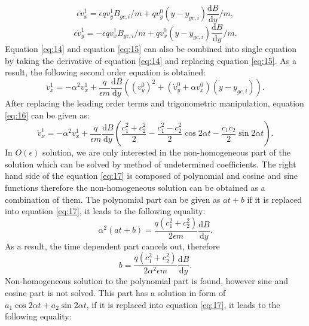 \documentclass[11pt]{amsart}
\begin{document}
\begin{equation}
\label{eq:14}
\epsilon\dot{v}_{x}^{1}=\epsilon q v_{y}^{1} B_{gc,i}/m+q v_{y}^{0}(y-y_{gc,i})\frac{\mathrm{d}B}{\mathrm{d}y}/m,
\end{equation}
\begin{equation}
\label{eq:15}
\epsilon\dot{v}_{y}^{1}=-\epsilon q v_{x}^{1} B_{gc,i}/m+q v_{x}^{0}(y-y_{gc,i})\frac{\mathrm{d}B}{\mathrm{d}y}/m.
\end{equation}
Equation \ref{eq:14} and equation \ref{eq:15} can also be combined into single equation by taking the derivative of equation \ref{eq:14} and replacing equation \ref{eq:15}. As a result, the following second order equation is obtained:
\begin{equation}
\label{eq:16}
\ddot{v}_{x}^{1}=-\alpha^2 v_{x}^{1}+\frac{q}{\epsilon m}\frac{\mathrm{d}B}{\mathrm{d}y}((v_{y}^{0})^2+(\dot{v}_{y}^{0}+\alpha v_{x}^{0})(y-y_{gc,i})).
\end{equation}
After replacing the leading order terms and trigonometric manipulation, equation \ref{eq:16} can be given as:
\begin{equation}
\label{eq:17}
\ddot{v}_{x}^{1}=-\alpha^2 v_{x}^{1}+\frac{q}{\epsilon m}\frac{\mathrm{d}B}{\mathrm{d}y}(\frac{c_{1}^2+c_{2}^{2}}{2}-\frac{c_{1}^2-c_{2}^{2}}{2}\cos 2 \alpha t-\frac{c_1 c_2}{2}\sin 2\alpha t).
\end{equation}
In $O(\epsilon)$ solution, we are only interested in the non-homogeneous part of the solution which can be solved by method of undetermined coefficients. The right hand side of the equation \ref{eq:17} is composed of polynomial and cosine and sine functions therefore the non-homogeneous solution can be obtained as a combination of them. The polynomial part can be given as $a t +b$ if it is replaced into equation \ref{eq:17}, it leads to the following equality:
\begin{equation}
\label{eq:18}
\alpha^2 (a t +b)=\frac{q(c_{1}^2+c_{2}^{2})}{2\epsilon m}\frac{\mathrm{d}B}{\mathrm{d}y}.
\end{equation}
As a result, the time dependent part cancels out, therefore 
\begin{equation}
\label{eq:19}
b=\frac{q(c_{1}^2+c_{2}^{2})}{2\alpha^2 \epsilon m}\frac{\mathrm{d}B}{\mathrm{d}y}.
\end{equation}
Non-homogeneous solution to the polynomial part is found, however sine and cosine part is not solved. This part has a solution in form of $a_1 \cos 2 \alpha t + a_2 \sin 2\alpha t$, if it is replaced into equation \ref{eq:17}, it leads to the following equality:
\end{document}
